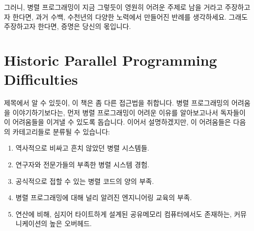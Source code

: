 
그러니, 병렬 프로그래밍이 지금 그렇듯이 영원히 어려운 주제로 남을 거라고
주장하고자 한다면, 과거 수백, 수천년의 다양한 노력에서 만들어진 반례를
생각하세요. 그래도 주장하고자 한다면, 증명은 당신의 몫입니다.


\section{Historic Parallel Programming Difficulties}
\label{sec:intro:Historic Parallel Programming Difficulties}

제목에서 알 수 있듯이, 이 책은 좀 다른 접근법을 취합니다.
병렬 프로그래밍의 어려움을 이야기하기보다는, 먼저 병렬 프로그래밍이 어려운
이유를 알아보고나서 독자들이 이 어려움들을 이겨낼 수 있도록 돕습니다.
이어서 설명하겠지만, 이 어려움들은 다음의 카테고리들로 분류될 수 있습니다:


\begin{enumerate}
\item	역사적으로 비싸고 흔치 않았던 병렬 시스템들.
\item	연구자와 전문가들의 부족한 병렬 시스템 경험.
\item	공식적으로 접할 수 있는 병렬 코드의 양의 부족.
\item	병렬 프로그래밍에 대해 널리 알려진 엔지니어링 교육의 부족.
\item	연산에 비해, 심지어 타이트하게 설계된 공유메모리 컴퓨터에서도 존재하는,
	커뮤니케이션의 높은 오버헤드.
\end{enumerate}

